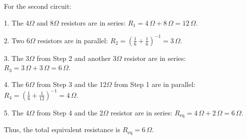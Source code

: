 \documentclass{article}
\begin{document}
For the second circuit:

1. The 4$\Omega$ and 8$\Omega$ resistors are in series:  
   \( R_1 = 4 \, \Omega + 8 \, \Omega = 12 \, \Omega \).

2. Two 6$\Omega$ resistors are in parallel:  
   \( R_2 = \left( \frac{1}{6} + \frac{1}{6} \right)^{-1} = 3 \, \Omega \).

3. The 3$\Omega$ from Step 2 and another 3$\Omega$ resistor are in series:  
   \( R_3 = 3 \, \Omega + 3 \, \Omega = 6 \, \Omega \).

4. The 6$\Omega$ from Step 3 and the 12$\Omega$ from Step 1 are in parallel:  
   \( R_4 = \left( \frac{1}{6} + \frac{1}{12} \right)^{-1} = 4 \, \Omega \).

5. The 4$\Omega$ from Step 4 and the 2$\Omega$ resistor are in series:  
   \( R_{\text{eq}} = 4 \, \Omega + 2 \, \Omega = 6 \, \Omega \).

Thus, the total equivalent resistance is \( R_{\text{eq}} = 6 \, \Omega \).
\bigskip
\end{document}
